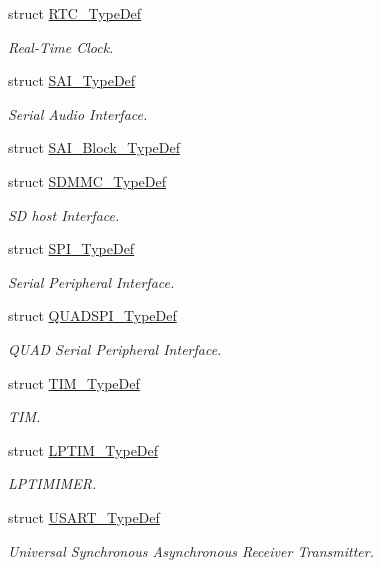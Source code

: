 \begin{DoxyCompactItemize}
struct \mbox{\hyperlink{struct_r_t_c___type_def}{R\+T\+C\+\_\+\+Type\+Def}}
\begin{DoxyCompactList}\small\item\em Real-\/\+Time Clock. \end{DoxyCompactList}\item 
struct \mbox{\hyperlink{struct_s_a_i___type_def}{S\+A\+I\+\_\+\+Type\+Def}}
\begin{DoxyCompactList}\small\item\em Serial Audio Interface. \end{DoxyCompactList}\item 
struct \mbox{\hyperlink{struct_s_a_i___block___type_def}{S\+A\+I\+\_\+\+Block\+\_\+\+Type\+Def}}
\item 
struct \mbox{\hyperlink{struct_s_d_m_m_c___type_def}{S\+D\+M\+M\+C\+\_\+\+Type\+Def}}
\begin{DoxyCompactList}\small\item\em SD host Interface. \end{DoxyCompactList}\item 
struct \mbox{\hyperlink{struct_s_p_i___type_def}{S\+P\+I\+\_\+\+Type\+Def}}
\begin{DoxyCompactList}\small\item\em Serial Peripheral Interface. \end{DoxyCompactList}\item 
struct \mbox{\hyperlink{struct_q_u_a_d_s_p_i___type_def}{Q\+U\+A\+D\+S\+P\+I\+\_\+\+Type\+Def}}
\begin{DoxyCompactList}\small\item\em Q\+U\+AD Serial Peripheral Interface. \end{DoxyCompactList}\item 
struct \mbox{\hyperlink{struct_t_i_m___type_def}{T\+I\+M\+\_\+\+Type\+Def}}
\begin{DoxyCompactList}\small\item\em T\+IM. \end{DoxyCompactList}\item 
struct \mbox{\hyperlink{struct_l_p_t_i_m___type_def}{L\+P\+T\+I\+M\+\_\+\+Type\+Def}}
\begin{DoxyCompactList}\small\item\em L\+P\+T\+I\+M\+I\+M\+ER. \end{DoxyCompactList}\item 
struct \mbox{\hyperlink{struct_u_s_a_r_t___type_def}{U\+S\+A\+R\+T\+\_\+\+Type\+Def}}
\begin{DoxyCompactList}\small\item\em Universal Synchronous Asynchronous Receiver Transmitter. \end{DoxyCompactList}\item 

\end{DoxyCompactItemize}
